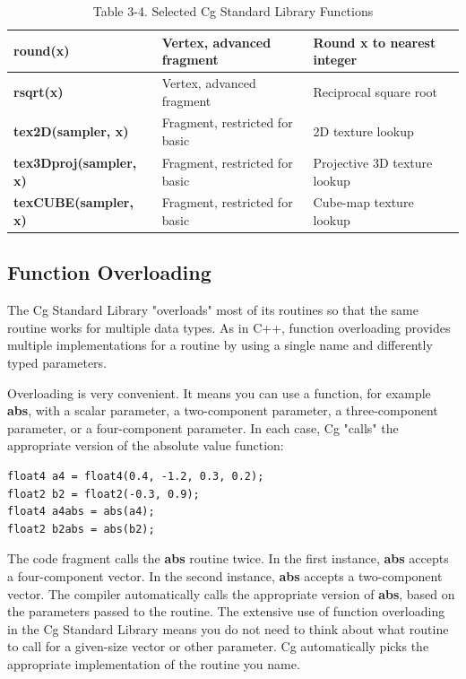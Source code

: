 \documentclass{book}
\begin{document}
\begin{table}
\begin{tabular}{ p{3cm} p{3cm} p{5cm}  }
\hline
\textbf{round(x)} & Vertex, advanced fragment & Round \textbf{x} to nearest integer \\
\hline
\textbf{rsqrt(x)} & Vertex, advanced fragment & Reciprocal square root \\
\hline
\textbf{tex2D(sampler, x)} & Fragment, restricted for basic & 2D texture lookup \\
\hline
\textbf{tex3Dproj(sampler, x)} & Fragment, restricted for basic & Projective 3D texture lookup \\
\hline
\textbf{texCUBE(sampler, x)} & Fragment, restricted for basic & Cube-map texture lookup \\
\hline
\end{tabular}

\caption{Table 3-4. Selected Cg Standard Library Functions}
\label{table:3-4}
\end{table}

\subsection*{Function Overloading}

The Cg Standard Library "overloads" most of its routines so that the same routine works for multiple data types. As in C++, function overloading provides multiple implementations for a routine by using a single name and differently typed parameters.

Overloading is very convenient. It means you can use a function, for example \textbf{abs}, with a scalar parameter, a two-component parameter, a three-component parameter, or a four-component parameter. In each case, Cg "calls" the appropriate version of the absolute value function:

\FloatBarrier
\begin{lstlisting}
float4 a4 = float4(0.4, -1.2, 0.3, 0.2);
float2 b2 = float2(-0.3, 0.9);
float4 a4abs = abs(a4);
float2 b2abs = abs(b2);
\end{lstlisting}
\FloatBarrier

The code fragment calls the \textbf{abs} routine twice. In the first instance, \textbf{abs} accepts a four-component vector. In the second instance, \textbf{abs} accepts a two-component vector. The compiler automatically calls the appropriate version of \textbf{abs}, based on the parameters passed to the routine. The extensive use of function overloading in the Cg Standard Library means you do not need to think about what routine to call for a given-size vector or other parameter. Cg automatically picks the appropriate implementation of the routine you name.
\end{document}
